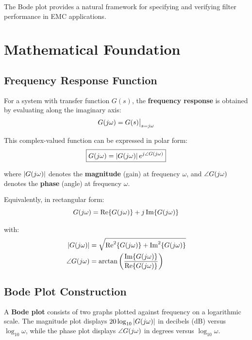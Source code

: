 The Bode plot provides a natural framework for specifying and verifying filter performance in EMC applications.

\section{Mathematical Foundation}
\label{sec:math_foundation}

\subsection{Frequency Response Function}

For a system with transfer function $G(s)$, the \textbf{frequency response} is obtained by evaluating along the imaginary axis:
\begin{equation}
G(j\omega) = G(s)\big|_{s=j\omega}
\label{eq:freq_response}
\end{equation}

This complex-valued function can be expressed in polar form:
\begin{equation}
\boxed{G(j\omega) = \left|G(j\omega)\right| e^{j\angle G(j\omega)}}
\label{eq:polar_form}
\end{equation}

where $\left|G(j\omega)\right|$ denotes the \textbf{magnitude} (gain) at frequency $\omega$, and $\angle G(j\omega)$ denotes the \textbf{phase} (angle) at frequency $\omega$.

Equivalently, in rectangular form:
\begin{equation}
G(j\omega) = \text{Re}\{G(j\omega)\} + j\,\text{Im}\{G(j\omega)\}
\label{eq:rectangular}
\end{equation}

with:
\begin{align}
\left|G(j\omega)\right| &= \sqrt{\text{Re}^2\{G(j\omega)\} + \text{Im}^2\{G(j\omega)\}} \\
\angle G(j\omega) &= \arctan\left(\frac{\text{Im}\{G(j\omega)\}}{\text{Re}\{G(j\omega)\}}\right)
\end{align}

\subsection{Bode Plot Construction}

A \textbf{Bode plot} consists of two graphs plotted against frequency on a logarithmic scale. The magnitude plot displays $20\log_{10}\left|G(j\omega)\right|$ in decibels (dB) versus $\log_{10}\omega$, while the phase plot displays $\angle G(j\omega)$ in degrees versus $\log_{10}\omega$.

